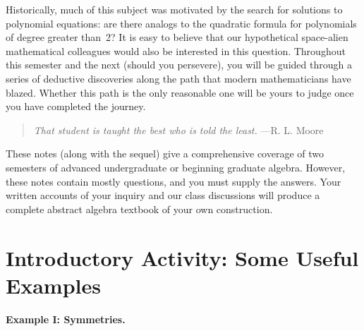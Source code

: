Historically, much of this subject was motivated by the search for solutions to polynomial equations: are there analogs to the quadratic formula for polynomials of degree greater than~2? It is easy to believe that our hypothetical space-alien mathematical colleagues would also be interested in this question. Throughout this semester and the next (should you persevere), you will be guided through a series of deductive discoveries along the path that modern mathematicians have blazed. Whether this path is the only reasonable one will be yours to judge once you have completed the journey.

\begin{quote}
  \textit{That student is taught the best who is told the least.} ---R. L. Moore
\end{quote}

These notes (along with the sequel) give a comprehensive coverage of two semesters of advanced undergraduate or beginning graduate algebra. However, these notes contain mostly questions, and you must supply the answers. Your written accounts of your inquiry and our class discussions will produce a complete abstract algebra textbook of your own construction.

\mainmatter

\chapter*{Introductory Activity: Some Useful Examples}

\textbf{Example I: Symmetries.}
\begin{annotation}
\end{annotation}

